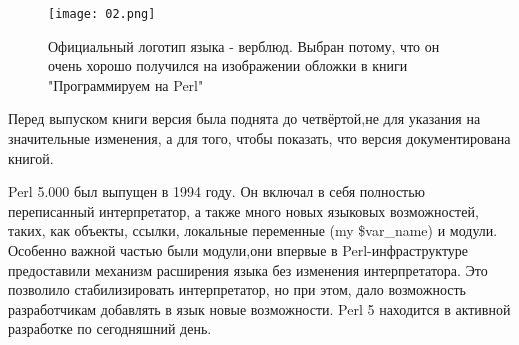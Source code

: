 \documentclass[spec, och, referat, times]{SCWorks}
\begin{document}
\begin{figure}[!ht]
	\centering
    \texttt{[image: 02.png]}
	\caption{Официальный логотип языка - верблюд. Выбран потому, что он очень хорошо получился на изображении обложки в книги "Программируем на Perl"}
\end{figure}

Перед выпуском книги версия была поднята до четвёртой,не для указания на значительные изменения, а для того, чтобы показать, что версия документирована книгой.

Perl 5.000 был выпущен в 1994 году. Он включал в себя полностью переписанный интерпретатор, а также много новых языковых возможностей, таких, как объекты, ссылки, локальные переменные (my \$var\_name) и модули. Особенно важной частью были модули,они впервые в Perl-инфраструктуре предоставили механизм расширения языка без изменения интерпретатора. Это позволило стабилизировать интерпретатор, но при этом, дало возможность разработчикам добавлять в язык новые возможности. Perl 5 находится в активной разработке по сегодняшний день.
\end{document}
